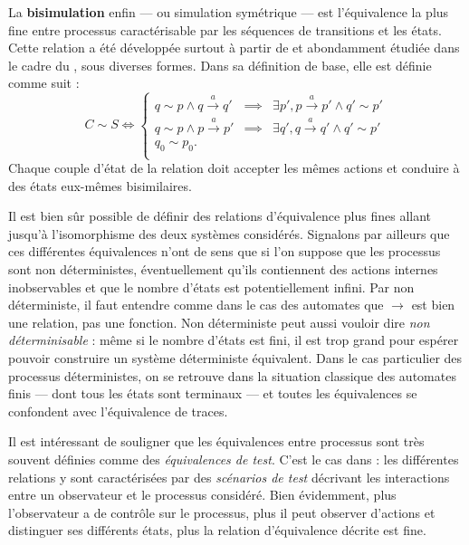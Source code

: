 La \textbf{bisimulation} enfin ---  ou simulation sym\'etrique ---
est l'\'equivalence la plus fine entre processus caract\'erisable
par les s\'equences de transitions et les \'etats. Cette relation a
\'et\'e d\'evelopp\'ee surtout \`a partir de \cite{milner-ccs} et
abondamment \'etudi\'ee dans le cadre du \pc, sous diverses
formes. Dans sa d\'efinition de base, elle est d\'efinie comme suit :
$$
C \sim S \Leftrightarrow 
\left\{
    \begin{array}{lcl}
        q \sim p \wedge q\xrightarrow{a} q' &\implies& \exists p', p\xrightarrow{a} p'
        \wedge q' \sim p' \\ 
        q \sim p \wedge p\xrightarrow{a} p' &\implies& \exists q', q\xrightarrow{a} q'
        \wedge q' \sim p' \\ 
        q_0 \sim p_0. &&\\
        \end{array}
\right.
$$    
Chaque couple d'\'etat de la relation doit accepter les m\^emes
actions et conduire \`a des \'etats eux-m\^emes
bisimilaires.

Il est bien s\^ur possible de d\'efinir des relations
d'\'equivalence plus fines allant jusqu'\`a l'isomorphisme des deux
syst\`emes consid\'er\'es. Signalons par ailleurs que ces
diff\'erentes \'equivalences n'ont de sens que si l'on suppose que
les processus sont non d\'eterministes, \'eventuellement
qu'ils contiennent des actions internes inobservables et que le nombre
d'\'etats est potentiellement infini. Par non
d\'eterministe, il faut entendre comme dans le cas des automates que
$\rightarrow$ est bien une relation, pas une fonction. Non
d\'eterministe peut aussi vouloir dire \emph{non d\'eterminisable} :
m\^eme si le nombre d'\'etats est fini, il est trop grand pour
esp\'erer pouvoir construire un syst\`eme d\'eterministe
\'equivalent. Dans le cas particulier des processus
d\'eterministes, on se retrouve dans la situation classique des
automates finis --- dont tous les \'etats sont terminaux --- et
toutes les \'equivalences se confondent avec l'\'equivalence de traces. 

Il est int\'eressant de souligner que les \'equivalences entre
processus sont tr\`es souvent d\'efinies comme des \emph{\'equivalences
de test}. C'est le cas dans \cite{sem-seq-proc} : les diff\'erentes
relations y sont caract\'eris\'ees par des \emph{sc\'enarios de
  test} d\'ecrivant les interactions entre un observateur et le
processus consid\'er\'e. Bien \'evidemment, plus l'observateur a de
contr\^ole sur le processus, plus il peut observer d'actions et
distinguer ses diff\'erents \'etats, plus la relation
d'\'equivalence d\'ecrite est fine. 

